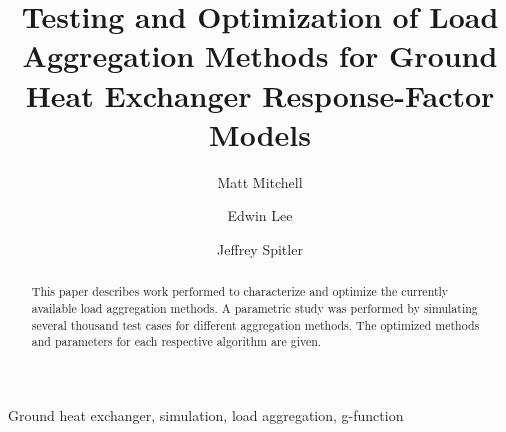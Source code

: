 \documentclass[review,12pt]{elsarticle}
\begin{document}
\begin{frontmatter}


\title{Testing and Optimization of Load Aggregation Methods for Ground Heat Exchanger Response-Factor Models}




\author[label1]{Matt Mitchell}
\author[label2]{Edwin Lee}
\author[label1]{Jeffrey Spitler}

\address[label1]{Oklahoma State University, Stillwater OK.}
\address[label2]{National Renewable Energy Laboratory, Golden CO.}


\begin{abstract}
This paper describes work performed to characterize and optimize the currently available load aggregation methods. A parametric study was performed by simulating several thousand test cases for different aggregation methods. The optimized methods and parameters for each respective algorithm are given.
\end{abstract}

\begin{keyword}
Ground heat exchanger, simulation, load aggregation, g-function
\end{keyword}

\end{frontmatter}

\linenumbers

\end{document}

